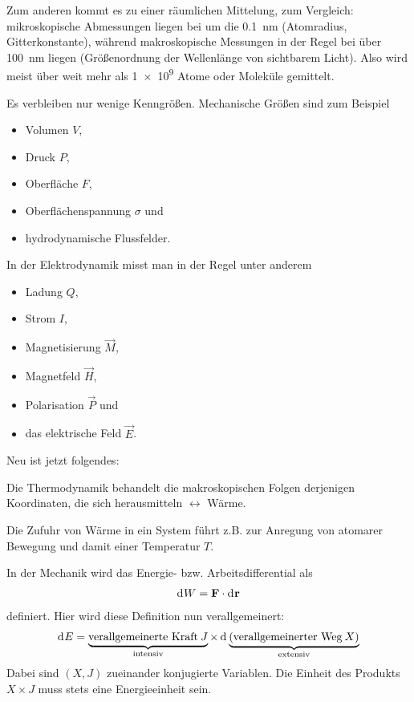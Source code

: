 Zum anderen kommt es zu einer räumlichen Mittelung, zum Vergleich: mikroskopische Abmessungen liegen bei um die \SI{0.1}{\nm} (Atomradius, Gitterkonstante), während makroskopische Messungen in der Regel bei über \SI{100}{\nm} liegen (Größenordnung der Wellenlänge von sichtbarem Licht).
Also wird meist über weit mehr als \num{1e9} Atome oder Moleküle gemittelt.


Es verbleiben nur wenige Kenngrößen. Mechanische Größen sind zum Beispiel
\begin{itemize}
    \item Volumen $V$,
    \item Druck $P$,
    \item Oberfläche $F$,
    \item Oberflächenspannung $\sigma$ und
    \item hydrodynamische Flussfelder.
\end{itemize}

In der Elektrodynamik misst man in der Regel unter anderem
\begin{itemize}
    \item Ladung $Q$,
    \item Strom $I$,
    \item Magnetisierung $\vec M$,
    \item Magnetfeld $\vec H$,
    \item Polarisation $\vec P$ und
    \item das elektrische Feld $\vec E$.
\end{itemize}

Neu ist jetzt folgendes:
\begin{formal}
    Die Thermodynamik behandelt die makroskopischen Folgen derjenigen Koordinaten, die sich herausmitteln $\leftrightarrow$ Wärme.
\end{formal}

Die Zufuhr von Wärme in ein System führt z.B. zur Anregung von atomarer Bewegung und damit einer Temperatur $T$.

In der Mechanik wird das Energie- bzw. Arbeitsdifferential als
\begin{align*}
    \mathop{\mathrm{d}^{}W} = \mathbf{F}\cdot\mathop{\mathrm{d}^{}\mathbf{r}}
\end{align*}
definiert. Hier wird diese Definition nun verallgemeinert:
\begin{align*}
    \mathop{\mathrm{d}^{}E} = \underbrace{\text{verallgemeinerte Kraft}\: J}_{\text{intensiv}} \times \mathop{\mathrm{d}^{}\underbrace{(\text{verallgemeinerter Weg}\: X)}_{\text{extensiv}}}
\end{align*}
Dabei sind $(X,J)$ zueinander konjugierte Variablen. Die Einheit des Produkts $X\times J$ muss stets eine Energieeinheit sein.

